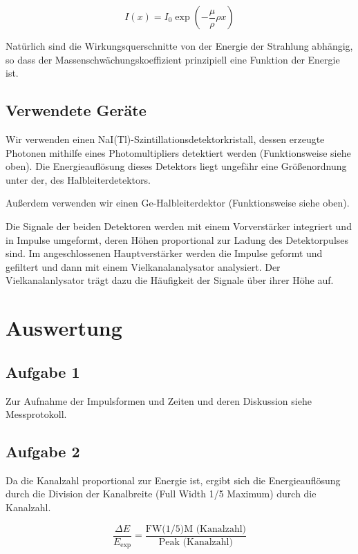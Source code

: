 \documentclass[a4paper,german,12pt,smallheadings]{scrartcl}
\begin{document}
\begin{equation}
  I(x) = I_0 \exp \left( -\frac{\mu}{\rho} \rho x \right)
\end{equation}

Natürlich sind die Wirkungsquerschnitte von der Energie der Strahlung abhängig,
so dass der Massenschwächungskoeffizient prinzipiell eine Funktion der Energie
ist.

\subsection{Verwendete Geräte}

Wir verwenden einen NaI(Tl)-Szintillationsdetektorkristall, dessen erzeugte
Photonen mithilfe eines Photomultipliers detektiert werden (Funktionsweise
siehe oben). Die Energieauflösung dieses Detektors liegt ungefähr eine
Größenordnung unter der, des Halbleiterdetektors.

Außerdem verwenden wir einen Ge-Halbleiterdektor (Funktionsweise siehe oben).

Die Signale der beiden Detektoren werden mit einem Vorverstärker integriert und
in Impulse umgeformt, deren Höhen proportional zur Ladung des Detektorpulses
sind. Im angeschlossenen Hauptverstärker werden die Impulse geformt und
gefiltert und dann mit einem Vielkanalanalysator analysiert. Der
Vielkanalanlysator trägt dazu die Häufigkeit der Signale über ihrer Höhe auf.

\section{Auswertung}

\subsection{Aufgabe 1}

Zur Aufnahme der Impulsformen und Zeiten und deren Diskussion siehe Messprotokoll.

\subsection{Aufgabe 2}

Da die Kanalzahl proportional zur Energie ist, ergibt sich die Energieauflösung
durch die Division der Kanalbreite (Full Width 1/5 Maximum) durch die Kanalzahl.

\begin{equation}
  \frac{\Delta E}{E_\text{exp}} = \frac{\text{FW(1/5)M (Kanalzahl)}}{\text{Peak (Kanalzahl)}}
\end{equation}
\end{document}
